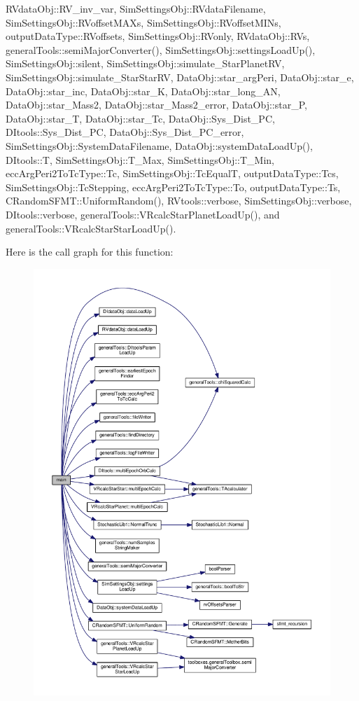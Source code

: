 R\-Vdata\-Obj\-::\-R\-V\-\_\-inv\-\_\-var, Sim\-Settings\-Obj\-::\-R\-Vdata\-Filename, Sim\-Settings\-Obj\-::\-R\-Voffset\-M\-A\-Xs, Sim\-Settings\-Obj\-::\-R\-Voffset\-M\-I\-Ns, output\-Data\-Type\-::\-R\-Voffsets, Sim\-Settings\-Obj\-::\-R\-Vonly, R\-Vdata\-Obj\-::\-R\-Vs, general\-Tools\-::semi\-Major\-Converter(), Sim\-Settings\-Obj\-::settings\-Load\-Up(), Sim\-Settings\-Obj\-::silent, Sim\-Settings\-Obj\-::simulate\-\_\-\-Star\-Planet\-R\-V, Sim\-Settings\-Obj\-::simulate\-\_\-\-Star\-Star\-R\-V, Data\-Obj\-::star\-\_\-arg\-Peri, Data\-Obj\-::star\-\_\-e, Data\-Obj\-::star\-\_\-inc, Data\-Obj\-::star\-\_\-\-K, Data\-Obj\-::star\-\_\-long\-\_\-\-A\-N, Data\-Obj\-::star\-\_\-\-Mass2, Data\-Obj\-::star\-\_\-\-Mass2\-\_\-error, Data\-Obj\-::star\-\_\-\-P, Data\-Obj\-::star\-\_\-\-T, Data\-Obj\-::star\-\_\-\-Tc, Data\-Obj\-::\-Sys\-\_\-\-Dist\-\_\-\-P\-C, D\-Itools\-::\-Sys\-\_\-\-Dist\-\_\-\-P\-C, Data\-Obj\-::\-Sys\-\_\-\-Dist\-\_\-\-P\-C\-\_\-error, Sim\-Settings\-Obj\-::\-System\-Data\-Filename, Data\-Obj\-::system\-Data\-Load\-Up(), D\-Itools\-::\-T, Sim\-Settings\-Obj\-::\-T\-\_\-\-Max, Sim\-Settings\-Obj\-::\-T\-\_\-\-Min, ecc\-Arg\-Peri2\-To\-Tc\-Type\-::\-Tc, Sim\-Settings\-Obj\-::\-Tc\-Equal\-T, output\-Data\-Type\-::\-Tcs, Sim\-Settings\-Obj\-::\-Tc\-Stepping, ecc\-Arg\-Peri2\-To\-Tc\-Type\-::\-To, output\-Data\-Type\-::\-Ts, C\-Random\-S\-F\-M\-T\-::\-Uniform\-Random(), R\-Vtools\-::verbose, Sim\-Settings\-Obj\-::verbose, D\-Itools\-::verbose, general\-Tools\-::\-V\-Rcalc\-Star\-Planet\-Load\-Up(), and general\-Tools\-::\-V\-Rcalc\-Star\-Star\-Load\-Up().



Here is the call graph for this function\-:
\nopagebreak
\begin{figure}[H]
\begin{center}
\leavevmode
\includegraphics[width=350pt]{mc_o_n_l_yorb_simulator_8cpp_a0ddf1224851353fc92bfbff6f499fa97_cgraph}
\end{center}
\end{figure}


